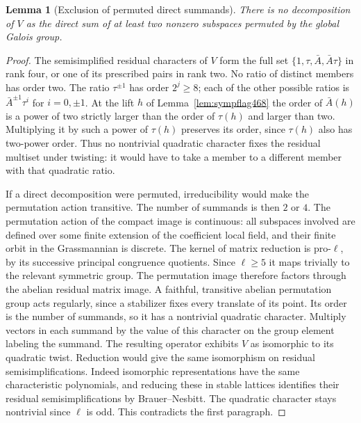 \documentclass[a4paper,11pt]{article}
\newtheorem{lemma}[proposition]{Lemma}
\theoremstyle{definition}
\theoremstyle{remark}
\numberwithin{equation}{section}
\begin{document}
\begin{lemma}[Exclusion of permuted direct summands]\leavevmode
\label{lem:noblocks474}
There is no decomposition of \(V\) as the direct sum of at least
two nonzero subspaces permuted by the global Galois group.
\end{lemma}
\begin{proof}
The semisimplified residual characters of \(V\) form the full set
\(\{1,\tau,\bar A,\bar A\tau\}\) in rank four, or one of its
prescribed pairs in rank two. No ratio of distinct members has
order two. The ratio \(\tau^{\pm1}\) has order \(2^j\ge8\);
each of the other possible ratios is \(\bar A^{\pm1}\tau^i\)
for \(i=0,\pm1\). At the lift \(h\) of Lemma~\ref{lem:sympflag468}
the order of \(\bar A(h)\) is a power of two strictly larger
than the order of \(\tau(h)\) and larger than two. Multiplying
it by such a power of \(\tau(h)\) preserves its order, since
\(\tau(h)\) also has two-power order. Thus no nontrivial
quadratic character fixes the residual multiset under twisting:
it would have to take a member to a different member with that
quadratic ratio.

If a direct decomposition were permuted, irreducibility would
make the permutation action transitive. The number of summands
is then \(2\) or \(4\). The permutation action of the compact
image is continuous: all subspaces involved are defined over
some finite extension of the coefficient local field, and their
finite orbit in the Grassmannian is discrete. The kernel of
matrix reduction is pro-\(\ell\), by its successive principal
congruence quotients. Since \(\ell\ge5\) it maps trivially to
the relevant symmetric group. The permutation image therefore
factors through the abelian residual matrix image. A faithful,
transitive abelian permutation group acts regularly, since a
stabilizer fixes every translate of its point. Its order is
the number of summands, so it has a nontrivial quadratic
character. Multiply vectors in each summand by the value of this
character on the group element labeling the summand. The resulting
operator exhibits \(V\) as isomorphic to its quadratic twist.
Reduction would give the same isomorphism on residual
semisimplifications. Indeed isomorphic representations have the
same characteristic polynomials, and reducing these in stable
lattices identifies their residual semisimplifications by
Brauer--Nesbitt. The quadratic character stays nontrivial since
\(\ell\) is odd. This contradicts the first paragraph.
\end{proof}
\end{document}

